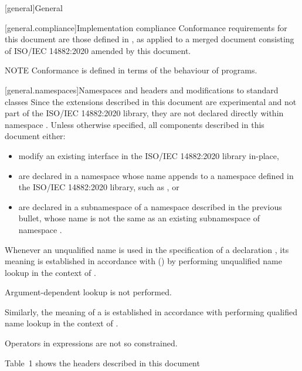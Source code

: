 [general]{General}

[general.compliance]{Implementation compliance}
Conformance requirements for this document are those defined in , as applied to a merged document consisting of ISO/IEC 14882:2020 amended by this document.

NOTE Conformance is defined in terms of the behaviour of programs.%

[general.namespaces]{Namespaces and headers and modifications to standard classes}
Since the extensions described in this document are experimental and not part of the ISO/IEC 14882:2020 library, they are not declared directly within namespace . Unless otherwise specified, all components described in this document either:

\begin{itemize}
    \item modify an existing interface in the ISO/IEC 14882:2020 library in-place,
    \item are declared in a namespace whose name appends  to a namespace defined in the ISO/IEC 14882:2020 library, such as , or
    \item are declared in a subnamespace of a namespace described in the previous bullet, whose name is not the same as an existing subnamespace of namespace .
\end{itemize}

Whenever an unqualified name is used
in the specification of a declaration ,
its meaning is established
in accordance with () by performing unqualified name lookup
in the context of .
\begin{note}
Argument-dependent lookup is not performed.\end{note}
Similarly, the meaning of a  is established
in accordance with performing qualified name lookup
in the context of .
\begin{note}
Operators in expressions are not so constrained.\end{note}

Table~1 shows the headers described in this document

